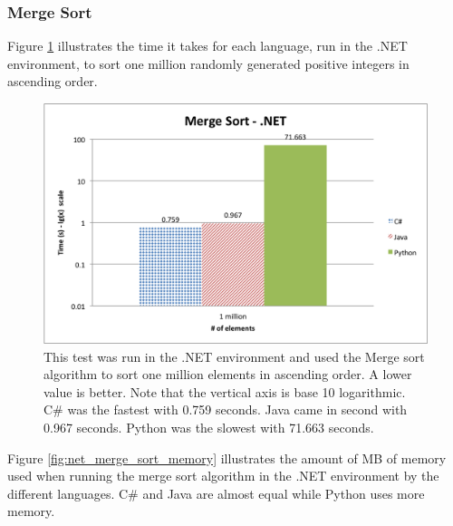 \subsubsection{Merge Sort}

Figure \ref{fig:net_merge_sort} illustrates the time it takes for each language, run in the .NET environment, to sort one million randomly generated positive integers in ascending order.

\begin{figure}[h]
	\centering
	\includegraphics[width=1.0\linewidth]{chapters/new_media/MergeSortNet.png}
	\caption{This test was run in the .NET environment and used the Merge sort algorithm to sort one million elements in ascending order. A lower value is better. Note that the vertical axis is base 10 logarithmic. C\# was the fastest with 0.759 seconds. Java came in second with 0.967 seconds. Python was the slowest with 71.663 seconds.}
	\label{fig:net_merge_sort}
\end{figure}

Figure \ref{fig:net_merge_sort_memory} illustrates the amount of MB of memory used when running the merge sort algorithm in the .NET environment by the different languages. C\# and Java are almost equal while Python uses more memory.

